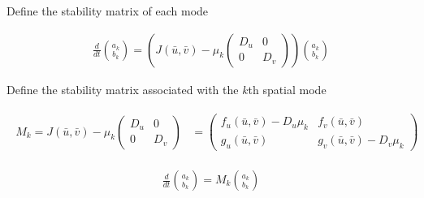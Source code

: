 \begin{frame}{Define the stability matrix of each mode}

  \vspace{-0.46cm}

  {\color{HydraWhite}\fontsize{9.2}{11.6}\selectfont
  \begin{align*}
    \frac{d}{dt}
    \binom{a_k}{b_k}
    =
    \left(
      J(\bar u,\bar v)-\mu_k
      \begin{pmatrix}
        D_u&0\\
        0&D_v
      \end{pmatrix}
    \right)
    \binom{a_k}{b_k}
  \end{align*}
  }

  \vspace{-0.30cm}

  {\color{HydraMuted}\fontsize{7.6}{9.2}\selectfont
    Define the stability matrix associated with the $k$th spatial mode
  \par}

  \vspace{-0.24cm}

  {\color{HydraWhite}\fontsize{8.7}{10.9}\selectfont
  \begin{align*}
    \boxed{
      \begin{aligned}
        M_k
        =
        J(\bar u,\bar v)-\mu_k
        \begin{pmatrix}
          D_u&0\\
          0&D_v
        \end{pmatrix}&=
        \begin{pmatrix}
          f_u(\bar u,\bar v)-D_u\mu_k
          &f_v(\bar u,\bar v)
          \\
          g_u(\bar u,\bar v)
          &g_v(\bar u,\bar v)-D_v\mu_k
        \end{pmatrix}
      \end{aligned}
    }
  \end{align*}
  }

  \vspace{-0.34cm}

  {\color{HydraWhite}\bfseries\fontsize{11.2}{14}\selectfont
  \begin{align*}
    \boxed{
      \frac{d}{dt}
      \binom{a_k}{b_k}
      =
      M_k
      \binom{a_k}{b_k}
    }
  \end{align*}
  }

  \vspace{-0.28cm}


\end{frame}


